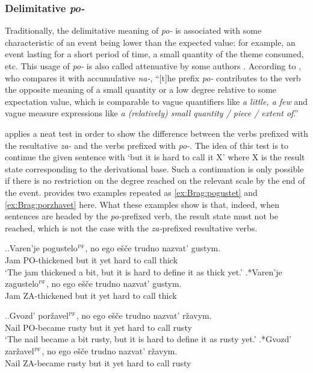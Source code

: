 \subsubsection{Delimitative \textit{po-}}
Traditionally, the delimitative meaning of \textit{po-} is associated with some characteristic of an event being lower than the expected value: for example, an event lasting for a short period of time, a small quantity of the theme consumed, etc. This usage of \textit{po-} is also called attenuative by some authors \citep[e.g.][]{Svenonius:04b}. According to \citet[47--48]{Filip:00}, who compares it with accumulative \textit{na-}, ``[t]he prefix \textit{po-} contributes to the verb the opposite meaning of a small quantity or a low degree relative to some expectation value, which is comparable to vague quantifiers like \textit{a little, a few} and vague measure expressions like \textit{a (relatively) small quantity / piece / extent of}.''

\citet[183]{Braginsky:08} applies a neat test in order to show the difference between the verbs prefixed with the resultative \textit{za-} and the verbs prefixed with \textit{po-}. The idea of this test is to continue the given sentence with `but it is hard to call it X' where X is the result state corresponding to the derivational base. Such a continuation is only possible if there is no restriction on the degree reached on the relevant scale by the end of the event. \citet[183]{Braginsky:08} provides two examples repeated as \ref{ex:Brag:pogustet} and \ref{ex:Brag:porzhavet} here. What these examples show is that, indeed, when sentences are headed by the \textit{po-}prefixed verb, the result state must not be reached, which is not the case with the \textit{za-}prefixed resultative verbs.

\ex.\label{ex:Brag:pogustet}\ag.Varen'je pogustelo$^{\textsc{pf}}$, no ego e\v{s}\v{c}e trudno nazvat' gustym.\\
Jam PO-thickened but it yet hard {to call} thick\\
\trans `The jam thickened a bit, but it is hard to define it as thick yet.'
\bg.*Varen'je zagustelo$^{\textsc{pf}}$, no ego e\v{s}\v{c}e trudno nazvat' gustym.\\
Jam ZA-thickened but it yet hard {to call} thick\\

\ex.\label{ex:Brag:porzhavet}\ag.Gvozd' por\v{z}avel$^{\textsc{pf}}$, no ego e\v{s}\v{c}e trudno nazvat' r\v{z}avym.\\
Nail {PO-became rusty} but it yet hard {to call} rusty\\
\trans `The nail became a bit rusty, but it is hard to define it as rusty yet.'
\bg.*Gvozd' zar\v{z}avel$^{\textsc{pf}}$, no ego e\v{s}\v{c}e trudno nazvat' r\v{z}avym.\\
Nail {ZA-became rusty} but it yet hard {to call} rusty\\

